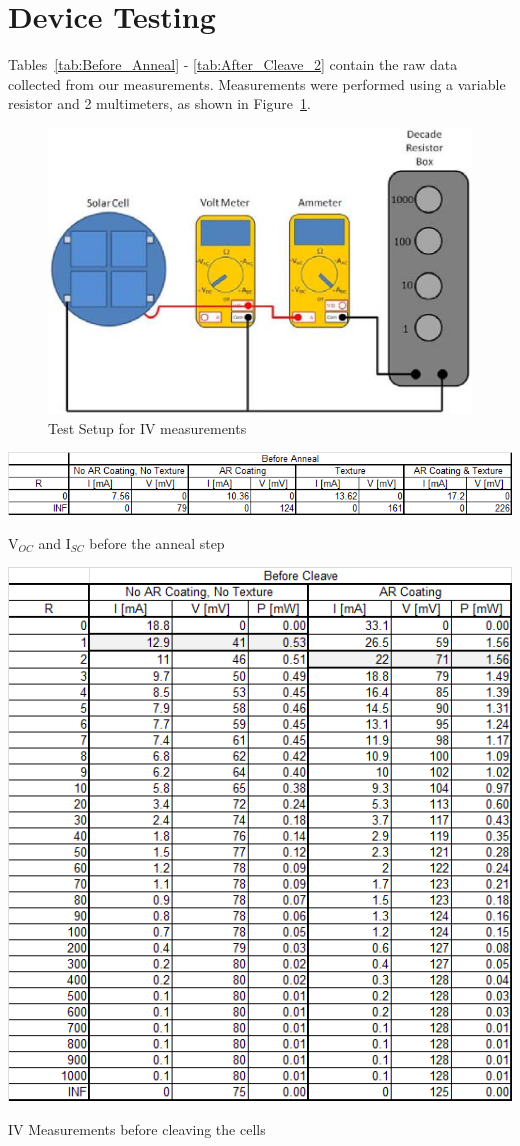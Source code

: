 \documentclass[letter,12pt]{article}
\begin{document}
\FloatBarrier
\section{Device Testing}

	Tables~\ref{tab:Before_Anneal} - \ref{tab:After_Cleave_2} contain the raw data collected from our measurements. Measurements were performed using a variable resistor and 2 multimeters, as shown in Figure~\ref{fig:Test_Setup}.
	
	\begin{figure}[h!]
		\centering
		\includegraphics[width=.5\textwidth]{./Images/Test_Setup.png}
		\caption{Test Setup for IV measurements}
		\label{fig:Test_Setup}
	\end{figure}
	
	\begin{table}[h!]
		\centering
		\includegraphics[width=.9\textwidth]{./Images/Tables/Before_Anneal.png}
		\caption{V$_{OC}$ and I$_{SC}$ before the anneal step}
		\label{tab:Before_Anneal}
	\end{table}
	
	\begin{table}[h!]
		\centering
		\includegraphics[width=.9\textwidth]{./Images/Tables/Before_Cleave_1.png}
		\caption{IV Measurements before cleaving the cells}
		\label{tab:Before_Cleave_1}
	\end{table}
	
\end{document}
